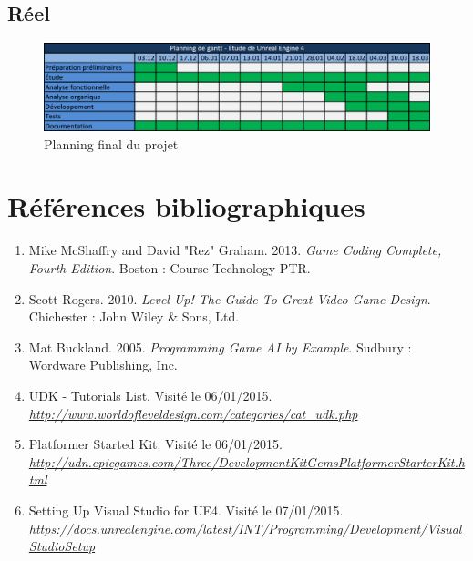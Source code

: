 \documentclass[11pt, a4paper, oneside]{article}
\begin{document}
\subsection{Réel}
\begin{figure}[h]
	\begin{center}
	\includegraphics[width=\textwidth, angle=90]{planningfinal}
	\caption{Planning final du projet}
	\label{planningfinal}
	\end{center}
\end{figure}
\newpage
\section{Références bibliographiques}
\begin{enumerate}
\item Mike McShaffry and David "Rez" Graham. 2013. \textit{Game Coding Complete, Fourth Edition}. Boston : Course Technology PTR.
\item Scott Rogers. 2010. \textit{Level Up! The Guide To Great Video Game Design}. Chichester : John Wiley \& Sons, Ltd.
\item Mat Buckland. 2005. \textit{Programming Game AI by Example}. Sudbury : Wordware Publishing, Inc.
\item UDK - Tutorials List. Visité le 06/01/2015.\\\textit{\url{http://www.worldofleveldesign.com/categories/cat_udk.php}}
\item Platformer Started Kit.  Visité le 06/01/2015.\\\textit{\url{http://udn.epicgames.com/Three/DevelopmentKitGemsPlatformerStarterKit.html}}
\item Setting Up Visual Studio for UE4. Visité le 07/01/2015.\\\textit{\url{https://docs.unrealengine.com/latest/INT/Programming/Development/VisualStudioSetup}}
\end{enumerate}
\newpage
\listoffigures
\listoftables
\lstlistoflistings
\end{document}
